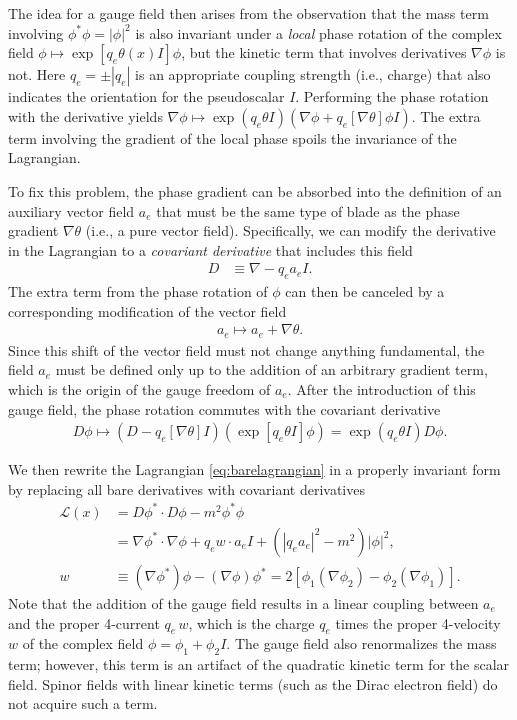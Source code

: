 \documentclass[1p,sort&compress]{elsarticle}
\numberwithin{equation}{section}
\begin{document}
The idea for a gauge field then arises from the observation that the mass term involving $\phi^*\phi = |\phi|^2$ is also invariant under a \emph{local} phase rotation of the complex field $\phi \mapsto \exp[q_e\theta(x)I]\phi$, but the kinetic term that involves derivatives $\nabla\phi$ is not.  Here $q_e = \pm|q_e|$ is an appropriate coupling strength (i.e., charge) that also indicates the orientation for the pseudoscalar $I$.  Performing the phase rotation with the derivative yields $\nabla\phi \mapsto \exp(q_e\theta I)(\nabla\phi + q_e[\nabla\theta]\phi I)$.  The extra term involving the gradient of the local phase spoils the invariance of the Lagrangian.

To fix this problem, the phase gradient can be absorbed into the definition of an auxiliary vector field $a_e$ that must be the same type of blade as the phase gradient $\nabla \theta$ (i.e., a pure vector field).  Specifically, we can modify the derivative in the Lagrangian to a \emph{covariant derivative} that includes this field 
\begin{align}
  D &\equiv \nabla - q_e a_e I.
\end{align}
The extra term from the phase rotation of $\phi$ can then be canceled by a corresponding modification of the vector field 
\begin{align}\label{eq:vecpotgauge}
  a_e \mapsto a_e + \nabla\theta.
\end{align}
Since this shift of the vector field must not change anything fundamental, the field $a_e$ must be defined only up to the addition of an arbitrary gradient term, which is the origin of the gauge freedom of $a_e$.  After the introduction of this gauge field, the phase rotation commutes with the covariant derivative
\begin{align}
  D\phi \mapsto (D - q_e[\nabla\theta]I)(\exp[q_e\theta I]\phi) = \exp(q_e\theta I)D\phi. 
\end{align}

We then rewrite the Lagrangian \eqref{eq:barelagrangian} in a properly invariant form by replacing all bare derivatives with covariant derivatives
\begin{align}\label{eq:covariantlagrangian}
  \mathcal{L}(x) &= D\phi^*\cdot D\phi - m^2 \phi^*\phi \\
  &= \nabla\phi^*\cdot \nabla\phi+q_e w\cdot a_eI + (|q_e a_e|^2-m^2)|\phi|^2, \nonumber \\
  w &\equiv (\nabla\phi^*)\phi -(\nabla\phi)\phi^* = 2[\phi_1(\nabla\phi_2) - \phi_2 (\nabla\phi_1)].
\end{align}
Note that the addition of the gauge field results in a linear coupling between $a_e$ and the proper 4-current $q_e\,w$, which is the charge $q_e$ times the proper 4-velocity $w$ of the complex field $\phi = \phi_1 + \phi_2 I$.  The gauge field also renormalizes the mass term; however, this term is an artifact of the quadratic kinetic term for the scalar field. Spinor fields with linear kinetic terms (such as the Dirac electron field) do not acquire such a term.
\end{document}
